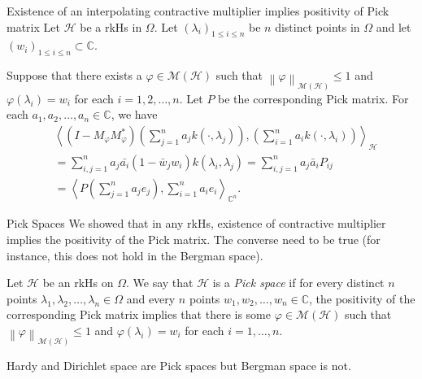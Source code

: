 \documentclass[handout]{beamer}
\newcommand{\C}{\mathbb C}
\newcommand{\calH}{{\mathcal H}}
\newcommand{\calM}{{\mathcal M}}
\newcommand{\ip}[1]{\left\langle #1 \right\rangle}
\newcommand{\norm}[1]{\left\lVert #1 \right\rVert}
\begin{document}
\begin{frame}{Existence of an interpolating contractive multiplier implies positivity of Pick matrix}
Let $\calH$ be a rkHs in $\Omega$. Let $\left( \lambda_{i} \right)_{1\le i \le n}$ be $n$ distinct points in $\Omega$ and let $\left( w_{i} \right)_{1 \le i \le n} \subset \C$.

Suppose that there exists a $\varphi \in \calM \left( \calH \right)$ such that $\norm{\varphi}_{\calM \left( \calH \right)} \le 1$ and $\varphi \left( \lambda_{i} \right) = w_{i}$ for each $i=1,2, \ldots , n$. Let $P$ be the corresponding Pick matrix. \pause For each $a_{1}, a_{2}, \ldots , a_{n} \in \C$, we have
\begin{align*}
& \ip{\left( I-M_{\varphi} M_{\varphi} ^{*} \right) \left( \sum_{j=1}^{n} a_{j} k\left( \cdot , \lambda_{j} \right) \right),  \left( \sum_{i=1}^{n} a_{i} k\left( \cdot , \lambda_{i} \right) \right)}_{\calH} \\ &= \sum_{i,j=1}^{n} a_{j}\bar{a_{i}} \left( 1-\bar w_{j} w_{i} \right) k\left( \lambda_{i}, \lambda_{j} \right) = \sum_{i,j=1}^{n} a_{j} \bar a_{i} P_{ij} \\ &= \ip{P\left( \sum_{j=1}^{n} a_{j} e_{j} \right) , \sum_{i=1}^{n} a_{i} e_{i}}_{\C ^{n}}.
\end{align*}
\end{frame}

\begin{frame}{Pick Spaces}
We showed that in any rkHs, existence of contractive multiplier implies the positivity of the Pick matrix. The converse need to be true (for instance, this does not hold in the Bergman space).
\pause
\begin{definition}
Let $\calH$ be an rkHs on $\Omega$. We say that $\calH$ is a \textit{Pick space} if for every distinct $n$ points $\lambda_{1}, \lambda_{2}, \ldots , \lambda_{n} \in \Omega$ and every $n$ points $w_{1}, w_{2}, \ldots , w_{n} \in \C$, the positivity of the corresponding Pick matrix implies that there is some $\varphi \in \calM \left( \calH \right)$ such that $\norm{\varphi}_{\calM \left( \calH \right)} \le 1$ and $\varphi \left( \lambda_{i} \right) = w_{i}$ for each $i=1, \ldots , n$.
\label{def:Pick space}
\end{definition}
\pause
\begin{example}
Hardy and Dirichlet space are Pick spaces but Bergman space is not.
\end{example}
\end{frame}
\end{document}
